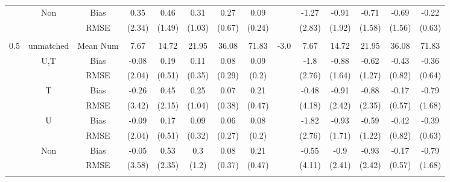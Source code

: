 \begin{tabular}{@{\extracolsep{5pt}}lc|cccccc|lccccc}
 & Non & Bias & 0.35 & 0.46 & 0.31 & 0.27 & 0.09 &  & -1.27 & -0.91 & -0.71 & -0.69 & -0.22 \\
 &  & RMSE & (2.34) & (1.49) & (1.03) & (0.67) & (0.24) &  & (2.83) & (1.92) & (1.58) & (1.56) & (0.63) \\
 &  &  &  &  &  &  &  &  &  &  &  &  &  \\
0.5 & unmatched & Mean Num & 7.67 & 14.72 & 21.95 & 36.08 & 71.83 & -3.0 & 7.67 & 14.72 & 21.95 & 36.08 & 71.83 \\
 & U,T & Bias & -0.08 & 0.19 & 0.11 & 0.08 & 0.09 &  & -1.8 & -0.88 & -0.62 & -0.43 & -0.36 \\
 &  & RMSE & (2.04) & (0.51) & (0.35) & (0.29) & (0.2) &  & (2.76) & (1.64) & (1.27) & (0.82) & (0.64) \\
 & T & Bias & -0.26 & 0.45 & 0.25 & 0.07 & 0.21 &  & -0.48 & -0.91 & -0.88 & -0.17 & -0.79 \\
 &  & RMSE & (3.42) & (2.15) & (1.04) & (0.38) & (0.47) &  & (4.18) & (2.42) & (2.35) & (0.57) & (1.68) \\
 & U & Bias & -0.09 & 0.17 & 0.09 & 0.06 & 0.08 &  & -1.82 & -0.93 & -0.59 & -0.42 & -0.39 \\
 &  & RMSE & (2.04) & (0.51) & (0.32) & (0.27) & (0.2) &  & (2.76) & (1.71) & (1.22) & (0.82) & (0.63) \\
 & Non & Bias & -0.05 & 0.53 & 0.3 & 0.08 & 0.21 &  & -0.55 & -0.9 & -0.93 & -0.17 & -0.79 \\
 &  & RMSE & (3.58) & (2.35) & (1.2) & (0.37) & (0.47) &  & (4.11) & (2.41) & (2.42) & (0.57) & (1.68) \\
 &  &  &  &  &  &  &  &  &  &  &  &  &  \\
\hline 
\bottomrule 
\end{tabular}
